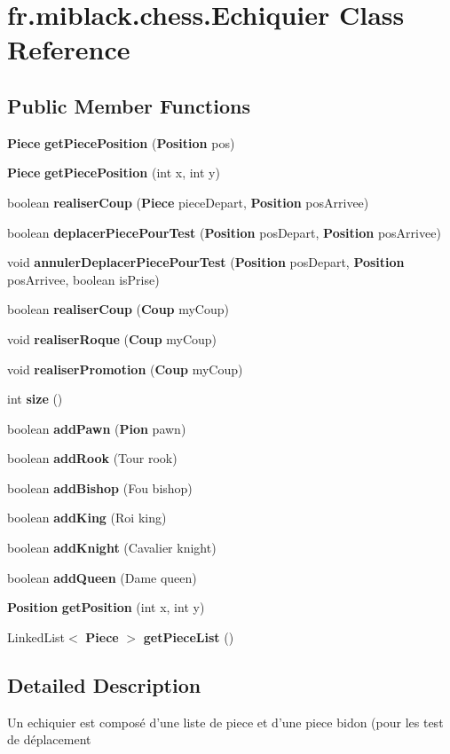\section{fr.\-miblack.\-chess.\-Echiquier Class Reference}
\label{classfr_1_1miblack_1_1chess_1_1Echiquier}
\subsection*{Public Member Functions}
\begin{DoxyCompactItemize}
\item 
{\bf Piece} {\bf get\-Piece\-Position} ({\bf Position} pos)
\item 
{\bf Piece} {\bf get\-Piece\-Position} (int x, int y)
\item 
boolean {\bf realiser\-Coup} ({\bf Piece} piece\-Depart, {\bf Position} pos\-Arrivee)
\item 
boolean {\bf deplacer\-Piece\-Pour\-Test} ({\bf Position} pos\-Depart, {\bf Position} pos\-Arrivee)
\item 
void {\bf annuler\-Deplacer\-Piece\-Pour\-Test} ({\bf Position} pos\-Depart, {\bf Position} pos\-Arrivee, boolean is\-Prise)
\item 
boolean {\bf realiser\-Coup} ({\bf Coup} my\-Coup)
\item 
void {\bf realiser\-Roque} ({\bf Coup} my\-Coup)
\item 
void {\bf realiser\-Promotion} ({\bf Coup} my\-Coup)
\item 
int {\bf size} ()
\item 
boolean {\bf add\-Pawn} ({\bf Pion} pawn)
\item 
boolean {\bf add\-Rook} (Tour rook)
\item 
boolean {\bf add\-Bishop} (Fou bishop)
\item 
boolean {\bf add\-King} (Roi king)
\item 
boolean {\bf add\-Knight} (Cavalier knight)
\item 
boolean {\bf add\-Queen} (Dame queen)
\item 
{\bf Position} {\bf get\-Position} (int x, int y)
\item 
Linked\-List$<$ {\bf Piece} $>$ {\bf get\-Piece\-List} ()
\end{DoxyCompactItemize}


\subsection{Detailed Description}
Un echiquier est composé d'une liste de piece et d'une piece bidon (pour les test de déplacement

